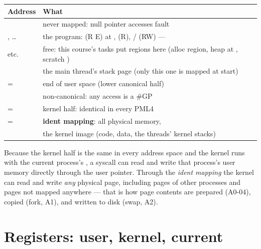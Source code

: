 \begin{center}
\small
\begin{tabular}{L{5.2cm}L{9.6cm}}
\toprule
\textbf{Address} & \textbf{What} \\
\midrule
{} & never mapped: null pointer accesses fault \\
, \ldots & the program:  (R E) at ,  (R), / (RW) ---  \\
 etc. & free: this course's tasks put regions here (alloc region, heap at , scratch ) \\
 & the main thread's stack page (only this one is mapped at start) \\
 =  & end of user space (lower canonical half) \\
 & non-canonical: any access is a \#GP \\
 =  & kernel half: identical in every PML4 \\
 =  & \textbf{ident mapping}: all physical memory,  \\
 & the kernel image (code, data, the threads' kernel stacks) \\
\bottomrule
\end{tabular}
\end{center}

\begin{swebbox}
Because the kernel half is the same in every address space and the kernel runs with the
current process's , a syscall can read and write that process's user memory
directly through the user pointer. Through the \emph{ident mapping} the kernel can read and
write \emph{any} physical page, including pages of other processes and pages not mapped
anywhere --- that is how page contents are prepared (A0-04), copied (fork, A1), and written
to disk (swap, A2).
\end{swebbox}

\section{Registers: user, kernel, current}

